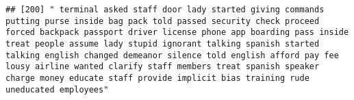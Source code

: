 \documentclass[
]{article}
\begin{document}
\begin{verbatim}
## [200] " terminal asked staff door lady started giving commands putting purse inside bag pack told passed security check proceed forced backpack passport driver license phone app boarding pass inside treat people assume lady stupid ignorant talking spanish started talking english changed demeanor silence told english afford pay fee lousy airline wanted clarify staff members treat spanish speaker charge money educate staff provide implicit bias training rude uneducated employees"                                                                                                                                                                                                                                                                                                                                                                                                                                                                                                                                                                                                                                                                                                                                                                                                                                                                                                                                                                                                                                                                                                                                                                                                                                                                                                    

\end{verbatim}
\end{document}
